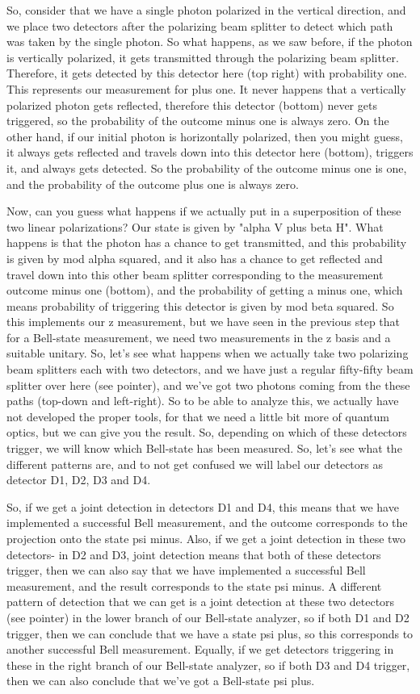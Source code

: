 So, consider that we have a single photon polarized in the vertical direction, and we place two detectors after the polarizing beam splitter to detect which path was taken by the single photon. So what happens, as we saw before, if the photon is vertically polarized, it gets transmitted through the polarizing beam splitter. Therefore, it gets detected by this detector here (top right) with probability one. This represents our measurement for plus one. It never happens that a vertically polarized photon gets reflected, therefore this detector (bottom) never gets triggered, so the probability of the outcome minus one is always zero. On the other hand, if our initial photon is horizontally polarized, then you might guess, it always gets reflected and travels down into this detector here (bottom), triggers it, and always gets detected. So the probability of the outcome minus one is one, and the probability of the outcome plus one is always zero.

Now, can you guess what happens if we actually put in a superposition of these two linear polarizations? Our state is given by "alpha V plus beta H". What happens is that the photon has a chance to get transmitted, and this probability is given by mod alpha squared, and it also has a chance to get reflected and travel down into this other beam splitter corresponding to the measurement outcome minus one (bottom), and the probability of getting a minus one, which means probability of triggering this detector is given by mod beta squared. So this implements our z measurement, but we have seen in the previous step that for a Bell-state measurement, we need two measurements in the z basis and a suitable unitary. So, let's see what happens when we actually take two polarizing beam splitters each with two detectors, and we have just a regular fifty-fifty beam splitter over here (see pointer), and we've got two photons coming from the these paths (top-down and left-right). So to be able to analyze this, we actually have not developed the proper tools, for that we need a little bit more of quantum optics, but we can give you the result. So, depending on which of these detectors trigger, we will know which Bell-state has been measured. So, let's see what the different patterns are, and to not get confused we will label our detectors as detector D1, D2, D3 and D4.

So, if we get a joint detection in detectors D1 and D4, this means that we have implemented a successful Bell measurement, and the outcome corresponds to the projection onto the state psi minus. Also, if we get a joint detection in these two detectors- in D2 and D3, joint detection means that both of these detectors trigger, then we can also say that we have implemented a successful Bell measurement, and the result corresponds to the state psi minus. A different pattern of detection that we can get is a joint detection at these two detectors (see pointer) in the lower branch of our Bell-state analyzer, so if both D1 and D2 trigger, then we can conclude that we have a state psi plus, so this corresponds to another successful Bell measurement. Equally, if we get detectors triggering in these in the right branch of our Bell-state analyzer, so if both D3 and D4 trigger, then we can also conclude that we've got a Bell-state psi plus.

